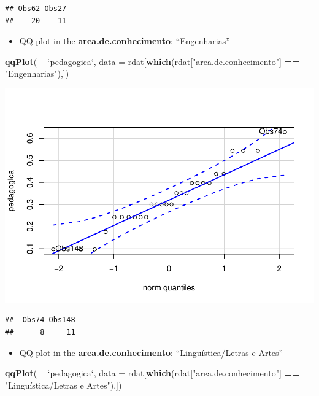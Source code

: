\documentclass[]{article}
\newenvironment{Shaded}{\begin{snugshade}}{\end{snugshade}}
\newcommand{\DataTypeTok}[1]{\textcolor[rgb]{0.13,0.29,0.53}{#1}}
\newcommand{\KeywordTok}[1]{\textcolor[rgb]{0.13,0.29,0.53}{\textbf{#1}}}
\newcommand{\NormalTok}[1]{#1}
\newcommand{\OperatorTok}[1]{\textcolor[rgb]{0.81,0.36,0.00}{\textbf{#1}}}
\newcommand{\StringTok}[1]{\textcolor[rgb]{0.31,0.60,0.02}{#1}}
\providecommand{\tightlist}{%
  \setlength{\itemsep}{0pt}\setlength{\parskip}{0pt}}
\begin{document}
\begin{verbatim}
## Obs62 Obs27 
##    20    11
\end{verbatim}

\begin{itemize}
\tightlist
\item
  QQ plot in the \textbf{area.de.conhecimento}: ``Engenharias''
\end{itemize}

\begin{Shaded}
\begin{Highlighting}[]
\KeywordTok{qqPlot}\NormalTok{( }\OperatorTok{~}\StringTok{ `}\DataTypeTok{pedagogica}\StringTok{`}\NormalTok{, }\DataTypeTok{data =}\NormalTok{ rdat[}\KeywordTok{which}\NormalTok{(rdat[}\StringTok{"area.de.conhecimento"}\NormalTok{] }\OperatorTok{==}\StringTok{ "Engenharias"}\NormalTok{),])}
\end{Highlighting}
\end{Shaded}

\includegraphics{factorialAnova_files/figure-latex/unnamed-chunk-18-1.pdf}

\begin{verbatim}
##  Obs74 Obs148 
##      8     11
\end{verbatim}

\begin{itemize}
\tightlist
\item
  QQ plot in the \textbf{area.de.conhecimento}: ``Linguística/Letras e
  Artes''
\end{itemize}

\begin{Shaded}
\begin{Highlighting}[]
\KeywordTok{qqPlot}\NormalTok{( }\OperatorTok{~}\StringTok{ `}\DataTypeTok{pedagogica}\StringTok{`}\NormalTok{, }\DataTypeTok{data =}\NormalTok{ rdat[}\KeywordTok{which}\NormalTok{(rdat[}\StringTok{"area.de.conhecimento"}\NormalTok{] }\OperatorTok{==}\StringTok{ "Linguística/Letras e Artes"}\NormalTok{),])}
\end{Highlighting}
\end{Shaded}
\end{document}
